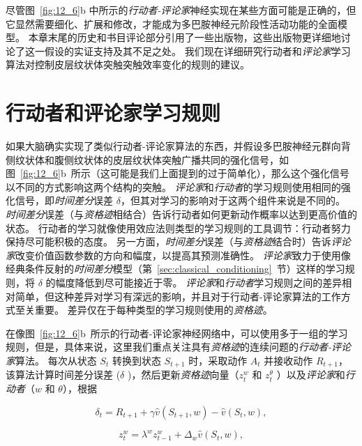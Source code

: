 尽管图~\ref{fig:12_6}b 中所示的\textit{行动者-评论家}神经实现在某些方面可能是正确的，但它显然需要细化、扩展和修改，才能成为多巴胺神经元阶段性活动功能的全面模型。
本章末尾的历史和书目评论部分引用了一些出版物，这些出版物更详细地讨论了这一假设的实证支持及其不足之处。
我们现在详细研究行动者和\textit{评论家}学习算法对控制皮层纹状体突触突触效率变化的规则的建议。





\section{行动者和评论家学习规则} \label{sec:ac_rules}

如果大脑确实实现了类似行动者-评论家算法的东西，并假设多巴胺神经元群向背侧纹状体和腹侧纹状体的皮层纹状体突触广播共同的强化信号，如图~\ref{fig:12_6}b~所示（这可能是我们上面提到的过于简单化），那么这个强化信号以不同的方式影响这两个结构的突触。
\textit{评论家}和\textit{行动者}的学习规则使用相同的强化信号，即\textit{时间差分}误差 $\delta$，但其对学习的影响对于这两个组件来说是不同的。
\textit{时间差分}误差（与\textit{资格迹}相结合）告诉行动者如何更新动作概率以达到更高价值的状态。
行动者的学习就像使用效应法则类型的学习规则的工具调节：行动者努力保持尽可能积极的态度。
另一方面，\textit{时间差分}误差（与\textit{资格迹}结合时）告诉\textit{评论家}改变价值函数参数的方向和幅度，以提高其预测准确性。
\textit{评论家}致力于使用像经典条件反射的\textit{时间差分}模型（第~\ref{sec:classical_conditioning}~节）这样的学习规则，将 $\delta$ 的幅度降低到尽可能接近于零。
\textit{评论家}和\textit{行动者}学习规则之间的差异相对简单，但这种差异对学习有深远的影响，并且对于行动者-评论家算法的工作方式至关重要。
差异仅在于每种类型的学习规则使用的\textit{资格迹}。


在像图~\ref{fig:12_6}b~所示的行动者-评论家神经网络中，可以使用多于一组的学习规则，但是，具体来说，这里我们重点关注具有\textit{资格迹}的连续问题的\textit{行动者-评论家}算法。
每次从状态 $S_t$ 转换到状态 $S_{t+1}$ 时，采取动作 $A_t$ 并接收动作 $R_{t+1}$，该算法计算时间差分误差 ($\delta$ )，然后更新\textit{资格迹}向量（$z_t^w$ 和 $z_t^{\theta}$ ）以及\textit{评论家}和\textit{行动者}（$w$ 和 $\theta$），根据

\begin{equation}
	\delta_t = R_{t+1}
		+ \gamma \hat{v} (S_{t+1}, w)
		- \hat{v} (S_t, w),
\end{equation}


\begin{equation}
	z_t ^w = \lambda^w z_{t-1}^w
		+ \Delta_w \hat{v} (S_t, w),
\end{equation}

